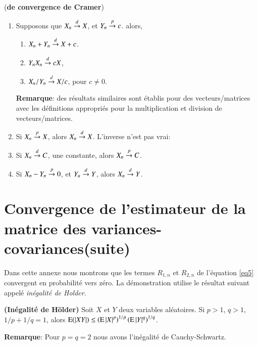 \documentclass[10pt, reqno]{amsart}
\begin{document}
\begin{theoreme}(\textbf{de convergence de Cramer})
    \begin{enumerate}[label = (\roman*)]
    \item Supposons que $X_n \overset{d}{\rightarrow} X$, et $Y_n \overset{p}{\rightarrow} c$. alors,
    \begin{enumerate}[label = (\alph*)]
        \item $X_n + Y_n \overset{d}{\rightarrow} X + c$.
        \item $Y_nX_n \overset{d}{\rightarrow} cX$,
        \item $X_n/Y_n \overset{d}{\rightarrow} X/c$, pour $c\neq 0$.
    \end{enumerate}
    \textbf{Remarque}: des résultats similaires sont établis pour des vecteurs/matrices avec 
les définitions appropriés pour la multiplication et division de vecteurs/matrices.
    \item  Si $X_n \overset{p}{\rightarrow} X$, alors $X_n \overset{d}{\rightarrow} X$. L'inverse n'est pas vrai:
    \item Si $X_n \overset{d}{\rightarrow} C$, une constante, alors $X_n \overset{p}{\rightarrow} C$.
    \item  Si $X_n - Y_n \overset{p}{\rightarrow} 0$, et $Y_n \overset{d}{\rightarrow} Y$, alors $X_n\overset{d}{\rightarrow} Y$.
    \end{enumerate}
\end{theoreme}
\newpage

\section{Convergence de l'estimateur de la matrice des variances-covariances(suite)}
Dans cette annexe nous montrons que les termes $R_{1,n}$ et $R_{2,n}$ de l'équation \eqref{eq5} convergent en probabilité vers zéro. La démonstration utilise le résultat suivant appelé \emph{inégalité de Holder}.
\begin{propriete}\textbf{(Inégalité de Hölder)} Soit $X$ et $Y$ deux variables aléatoires. Si $p>1$, $q>1$,  $1/p +1/q =1$,  alors $\operatorname{E}(\left\vert {XY} \right\vert) \leq \left(\operatorname{E}\left\vert {X} \right\vert^p\right)^{1/p}
\left(\operatorname{E}\left\vert {Y} \right\vert^q\right)^{1/q}$.
\end{propriete}
\textbf{Remarque}: Pour $p = q = 2$ nous avons l'inégalité de Cauchy-Schwartz.
\end{document}
